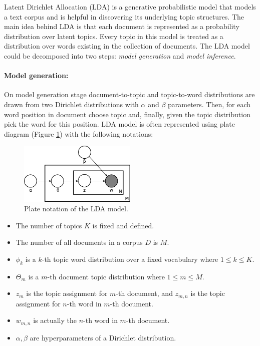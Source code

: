 \documentclass[12pt]{article}
\begin{document}
Latent Dirichlet Allocation (LDA) is a generative probabilistic model that models a text corpus and is helpful in discovering its underlying topic structures. The main idea behind LDA is that each document is represented as a probability distribution over latent topics. Every topic in this model is treated as a distribution over words existing in the collection of documents. The LDA model could be decomposed into two steps: \textit{model generation} and \textit{model inference}. 

\paragraph{Model generation:}
On model generation stage document-to-topic and topic-to-word distributions are drawn from two Dirichlet distributions with $\alpha$ and $\beta$ parameters. Then, for each word position in document choose topic and, finally, given the topic distribution pick the word for this position. LDA model is often represented using plate diagram (Figure \ref{fig:LDA_plate_notation}) with the following notations:
\begin{figure} [htbp]
	\centering
	\includegraphics[width=0.5\textwidth]{LDA_plate}
	\caption{Plate notation of the LDA model.}
	\label{fig:LDA_plate_notation}
\end{figure}
\begin{itemize}
	\item {The number of topics $K$ is fixed and defined}.
	\item {The number of all documents in a corpus $D$ is $M$}.
	\item {$\phi_k$ is a $k$-th topic word distribution over a fixed vocabulary where ${1\leq k\leq K}$}.
	\item {$\Theta_m$ is a $m$-th document topic distribution where $1\leq m \leq M$}.
	\item {$z_m$ is the topic assignment for $m$-th document, and $z_{m,n}$ is the topic assignment for $n$-th word in $m$-th document}.
	\item {$w_{m, n}$ is actually the $n$-th word in $m$-th document}.
	\item {$\alpha, \beta$ are hyperparameters of a Dirichlet distribution.}
\end{itemize}
\end{document}
